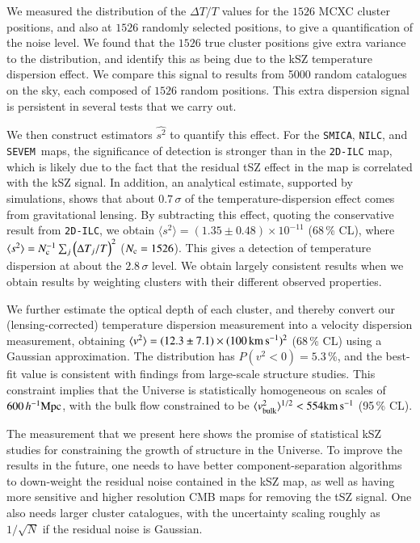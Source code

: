 \documentclass[traditabstract, longauth]{aa}
\newcommand{\nilc}{{\tt NILC}}
\newcommand{\sevem}{{\tt SEVEM}}
\newcommand{\smica}{{\tt SMICA}}
\newcommand{\1}{\'\i }
\def \kms{{\rm km\,s^{-1}}}
\begin{document}
We measured the distribution of the $\Delta T/T$ values for the $1526$ MCXC
cluster positions, and also at $1526$ randomly selected positions, to give a
quantification of the noise level. We found that the $1526$ true cluster
positions give extra variance to the distribution, and identify this as being
due to the kSZ temperature dispersion effect. We compare this signal to
results from 5000 random catalogues on the sky, each composed of $1526$ random
positions.  This extra dispersion signal is persistent in several tests that
we carry out.

We then construct estimators $\widehat{s^{2}}$ to quantify this effect. For
the \smica, \nilc, and \sevem\ maps, the significance of detection is stronger
than in the {\tt 2D-ILC} map, which is likely due to
the fact that the residual tSZ effect in the map is correlated with the kSZ
signal. In addition, an analytical estimate, supported by simulations, shows that about
$0.7\,\sigma$ of the temperature-dispersion effect comes from gravitational lensing. By subtracting
this effect, quoting the conservative result from {\tt 2D-ILC}, we obtain $\langle
s^{2} \rangle =(1.35 \pm 0.48)\times 10^{-11}$ (68\,\% CL), where $\langle
s^{2} \rangle =N_{\rm c}^{-1}\sum_{j}\left(\Delta T_{j}/T \right)^{2}$ ($N_{\rm c}=1526$).
This gives a detection of temperature dispersion at about the $2.8\,\sigma$
level. We obtain largely consistent results when we obtain results by weighting clusters
with their different observed properties.

We further estimate the optical depth of each cluster, and thereby convert our
(lensing-corrected) temperature dispersion measurement into a velocity
dispersion measurement,
obtaining $\langle v^{2}\rangle= (12.3 \pm 7.1) \times (100\,\kms)^{2}$ (68\,\%
CL) using a Gaussian approximation. The distribution has $P(v^{2}<0)=5.3$\,\%,
and the best-fit value is consistent with findings from large-scale structure
studies. This constraint implies that the Universe is statistically homogeneous
on scales of $600\,h^{-1}{\rm Mpc}$, with the bulk flow constrained to be $\langle v_{\rm bulk}^{2}\rangle^{1/2}<554\kms$ (95\,\% CL).

The measurement that we present here shows the promise of statistical kSZ
studies for constraining the growth of structure in the Universe.
To improve the results in the future, one needs to have better
component-separation algorithms to down-weight the residual noise contained in
the kSZ map, as well as having more sensitive and higher resolution CMB maps
for removing the tSZ signal.  One also needs larger
cluster catalogues, with the uncertainty scaling roughly as $1/\sqrt{N}$ if the
residual noise is Gaussian.
\end{document}
